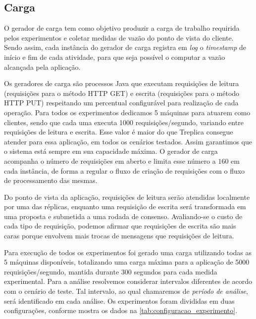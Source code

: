 \subsection{Carga}\label{subsec:carga}

O gerador de carga tem como objetivo produzir a carga de trabalho requirida pelos
experimentos e coletar medidas de vazão do ponto de vista do cliente. Sendo assim, cada
instância do gerador de carga registra em \emph{log} o \emph{timestamp} de início
e fim de cada atividade, para que seja possível o computar a vazão alcançada pela
aplicação.

Os geradores de carga são processos Java que executam requisições de leitura (requisições
para o método HTTP GET) e escrita (requisições para o método HTTP PUT) respeitando um
percentual configurável para realização de cada operação. Para todos os experimentos
dedicamos 5 máquinas para atuarem como clientes, sendo que cada uma executa 1000
requisições/segundo, variando entre requisições de leitura e escrita. Esse valor é maior
do que Treplica consegue atender para essa aplicação, em todos os cenários testados. Assim
garantimos que o sistema está sempre em sua capacidade máxima. O gerador de carga
acompanha o número de requisições em aberto e limita esse número a $160$ em cada
instância, de forma a regular o fluxo de criação de requisições com o fluxo de
processamento das mesmas.

Do ponto de vista da aplicação, requisições de leitura serão atendidas localmente por uma
das réplicas, enquanto uma requisição de escrita será transformada em uma proposta e
submetida a uma rodada de consenso. Avaliando-se o custo de cada tipo de requisição,
podemos afirmar que requisições de escrita são mais caras porque envolvem mais trocas de
mensagens que requisições de leitura.

Para execução de todos os experimentos foi gerado uma carga utilizando todas as 5 máquinas
disponíveis, totalizando uma carga máxima para a aplicação de 5000 requisições/segundo,
mantida durante 300 segundos para cada medida experimental. Para a análise resolvemos
considerar intervalos diferentes de acordo com o cenário de teste. Tal intervalo, ao qual
chamaremos de \emph{período de análise}, será identificado em cada análise. Os
experimentos foram divididas em duas configurações, conforme mostra os dados na
\autoref{tab:configuracao_experimento}.

\begin{table}[htb]
\end{table}

